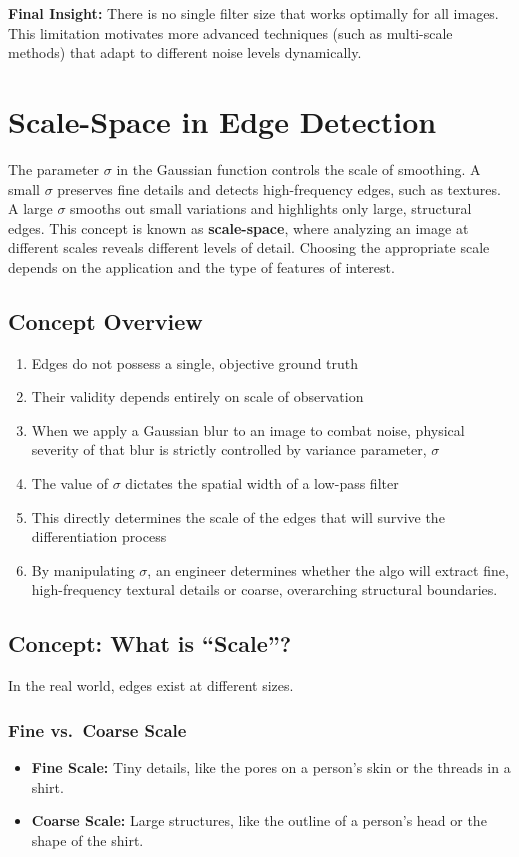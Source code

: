 \documentclass[12pt]{article}
\begin{document}
\textbf{Final Insight:}
There is no single filter size that works optimally for all images. This limitation motivates more advanced techniques (such as multi-scale methods) that adapt to different noise levels dynamically.



\section{Scale-Space in Edge Detection}
The parameter $\sigma$ in the Gaussian function controls the scale of smoothing. A small $\sigma$ preserves fine details and detects high-frequency edges, such as textures. A large $\sigma$ smooths out small variations and highlights only large, structural edges. This concept is known as \textbf{scale-space}, where analyzing an image at different scales reveals different levels of detail. Choosing the appropriate scale depends on the application and the type of features of interest.


\subsection{Concept Overview}
\begin{enumerate}
    \item Edges do not possess a single, objective ground truth
    \item Their validity depends entirely on scale of observation
    \item When we apply a Gaussian blur to an image to combat noise, physical severity of that blur is strictly controlled by variance parameter, $\sigma$
    \item The value of $\sigma$ dictates the spatial width of a low-pass filter
    \item This directly determines the scale of the edges that will survive the differentiation process
    \item By manipulating $\sigma$, an engineer determines whether the algo will extract fine, high-frequency textural details or coarse, overarching structural boundaries.
\end{enumerate}

\subsection{Concept: What is ``Scale''?}

In the real world, edges exist at different sizes.

\subsubsection*{Fine vs.\ Coarse Scale}
\begin{itemize}
    \item \textbf{Fine Scale:} Tiny details, like the pores on a person's skin or the threads in a shirt.
    \item \textbf{Coarse Scale:} Large structures, like the outline of a person's head or the shape of the shirt.
\end{itemize}
\end{document}
